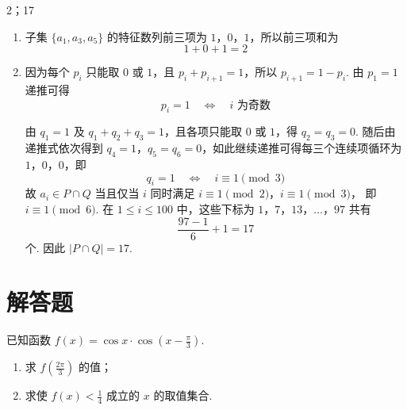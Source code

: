 \begin{answer}
2；17
\end{answer}

\begin{solution}
\begin{enumerate}
\item 子集 \(\{a_1,a_3,a_5\}\) 的特征数列前三项为 \(1\)，\(0\)，\(1\)，所以前三项和为
\[
1+0+1=2
\]

\item 因为每个 \(p_i\) 只能取 \(0\) 或 \(1\)，且 \(p_i+p_{i+1}=1\)，所以 \(p_{i+1}=1-p_i\). 由 \(p_1=1\) 递推可得
\[
p_i=1\quad\Longleftrightarrow\quad i\text{ 为奇数}
\]

由 \(q_1=1\) 及 \(q_1+q_2+q_3=1\)，且各项只能取 \(0\) 或 \(1\)，得 \(q_2=q_3=0\). 随后由递推式依次得到 \(q_4=1\)，\(q_5=q_6=0\)，如此继续递推可得每三个连续项循环为 \(1\)，\(0\)，\(0\)，即
\[
q_i=1\quad\Longleftrightarrow\quad i\equiv1\pmod3
\]
故 \(a_i\in P\cap Q\) 当且仅当 \(i\) 同时满足
\(i\equiv1\pmod2\)，\(i\equiv1\pmod3\)，
即 \(i\equiv1\pmod6\). 在 \(1\leqslant i\leqslant100\) 中，这些下标为
\(1\)，\(7\)，\(13\)，\(\ldots\)，\(97\)
共有
\[
\frac{97-1}{6}+1=17
\]
个. 因此 \(|P\cap Q|=17\).
\end{enumerate}
\end{solution}

\section{解答题}

\begin{problem}
已知函数 \( f(x) = \cos x \cdot \cos \left(x - \frac{\pi}{3}\right) \).
\begin{enumerate}
\item 求 \( f\left(\frac{2\pi}{3}\right) \) 的值；
\item 求使 \( f(x) < \frac{1}{4} \) 成立的 \( x \) 的取值集合.
\end{enumerate}
\end{problem}

